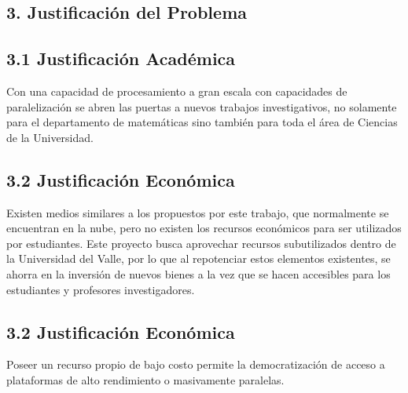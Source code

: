 \begin{doublespace}
\begin{tightcenter}
\section{3. Justificación del Problema}
\mylinespacing
\end{tightcenter}

\subsection{3.1 Justificación Académica}

Con una capacidad de procesamiento a gran escala con capacidades de paralelización se abren las puertas a nuevos trabajos investigativos, no solamente para el departamento de matemáticas sino también para toda el área de Ciencias de la Universidad.

\subsection{3.2  Justificación Económica}

Existen medios similares a los propuestos por este trabajo, que normalmente se encuentran en la nube, pero no existen los recursos económicos para ser utilizados por estudiantes. Este proyecto busca aprovechar recursos subutilizados dentro de la Universidad del Valle, por lo que al repotenciar estos elementos existentes, se ahorra en la inversión de nuevos bienes a la vez que se hacen accesibles para los estudiantes y profesores investigadores.

\subsection{3.2  Justificación Económica}

Poseer un recurso propio de bajo costo permite la democratización de acceso a plataformas de alto rendimiento o masivamente paralelas.

\mylinespacing
\mylinespacing
\begin{tightcenter}
\end{tightcenter}
\end{doublespace}
